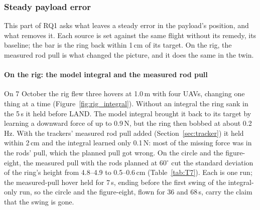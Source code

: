 
\subsubsection{Steady payload error}
\label{sec:res_steady}

This part of RQ1 asks what leaves a steady error in the payload's position, and what removes it. Each source is
set against the same flight without its remedy, its baseline; the bar is the ring back within 1\,cm of its target.
On the rig, the measured rod pull is what changed the picture, and it does the same in the twin.

\paragraph{On the rig: the model integral and the measured rod pull}
\label{sec:res_rig_integral}

On 7 October the rig flew three hovers at 1.0\,m with four UAVs, changing one thing at a time
(Figure~\ref{fig:rig_integral}). Without an integral the ring sank in the 5\,s it held before LAND. The model
integral brought it back to its target by learning a downward force of up to 0.9\,N, but the ring then bobbed
at about 0.2\,Hz. With the trackers' measured rod pull added (Section~\ref{sec:tracker}) it held within 2\,cm
and the integral learned only 0.1\,N: most of the missing force was in the rods' pull, which the planned pull
got wrong. On the circle and the figure-eight, the measured pull with the rods planned at 60$^\circ$ cut the
standard deviation of the ring's height from 4.8--4.9 to 0.5--0.6\,cm (Table~\ref{tab:T7}). Each is one run; the
measured-pull hover held for 7\,s, ending before the first swing of the integral-only run, so the circle and the
figure-eight, flown for 36 and 68\,s, carry the claim that the swing is gone.

